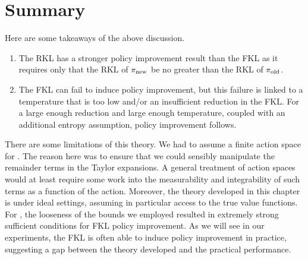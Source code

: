 \documentclass[\main/thesis.tex]{subfiles}
\begin{document}
\section{Summary}
Here are some takeaways of the above discussion. 
\begin{enumerate}
    \item The RKL has a stronger policy improvement result than the FKL as it requires only that the RKL of ${\pi_\mathrm{new}}$ be no greater than the RKL of ${\pi_\mathrm{old}}$.
    \item The FKL can fail to induce policy improvement, but this failure is linked to a temperature that is too low and/or an insufficient reduction in the FKL. For a large enough reduction and large enough temperature, coupled with an additional entropy assumption, policy improvement follows. 
\end{enumerate}


There are some limitations of this theory. We had to assume a finite action space for . The reason here was to ensure that we could sensibly manipulate the remainder terms in the Taylor expansions. A general treatment of action spaces would at least require some work into the measurability and integrability of such terms as a function of the action. Moreover, the theory developed in this chapter is under ideal settings, assuming in particular access to the true value functions. For , the looseness of the bounds we employed resulted in extremely strong sufficient conditions for FKL policy improvement. As we will see in our experiments, the FKL is often able to induce policy improvement in practice, suggesting a gap between the theory developed and the practical performance. 
\end{document}
